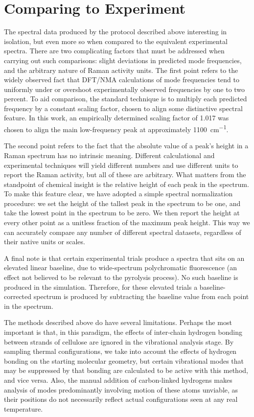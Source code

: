 \section{Comparing to Experiment}

The spectral data produced by the protocol described above interesting in isolation, but even more so when compared to the equivalent experimental spectra. There are two complicating factors that must be addressed when carrying out such comparisons: slight deviations in predicted mode frequencies, and the arbitrary nature of Raman activity units. The first point refers to the widely observed fact that DFT/NMA calculations of mode frequencies tend to uniformly under or  overshoot experimentally observed frequencies by one to two percent. To aid comparison, the standard technique is to multiply each predicted frequency by a constant scaling factor, chosen to align some distinctive spectral feature. In this work, an empirically determined scaling factor of 1.017 was chosen to align the main low-frequency peak at approximately \SI{1100}{cm^{-1}}.

The second point refers to the fact that the absolute value of a peak's height in a Raman spectrum has no intrinsic meaning. Different calculational and experimental techniques will yield different numbers and use different units to report the Raman activity, but all of these are arbitrary. What matters from the standpoint of chemical insight is the relative height of each peak in the spectrum. To make this feature clear, we have adopted a simple spectral normalization procedure: we set the height of the tallest peak in the spectrum to be one, and take the lowest point in the spectrum to be zero. We then report the height at every other point as a unitless fraction of the maximum peak height. This way we can accurately compare any number of different spectral datasets, regardless of their native units or scales.

A final note is that certain experimental trials produce a spectra that sits on an elevated linear baseline, due to wide-spectrum polychromatic fluorescence (an effect not believed to be relevant to the pyrolysis process). No such baseline is produced in the simulation. Therefore, for these elevated trials a baseline-corrected spectrum is produced by subtracting the baseline value from each point in the spectrum.

The methods described above do have several limitations. Perhaps the most important is that, in this paradigm, the effects of inter-chain hydrogen bonding between strands of cellulose are ignored in the vibrational analysis stage. By sampling thermal configurations, we take into account the effects of hydrogen bonding on the starting molecular geometry, but certain vibrational modes that may be suppressed by that bonding are calculated to be active with this method, and vice versa. Also, the manual addition of carbon-linked hydrogens makes analysis of modes predominantly involving motion of these atoms unviable, as their positions do not necessarily reflect actual configurations seen at any real temperature. 
